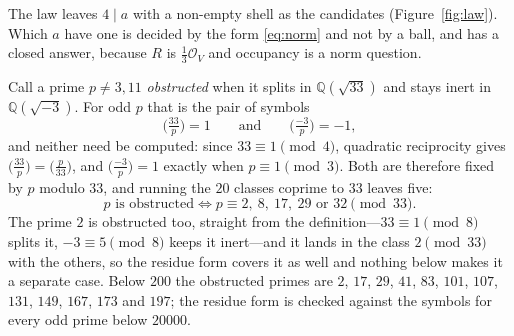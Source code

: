 \documentclass[11pt,reqno]{amsart}
\newcommand{\mc}{$, $}
\newcommand{\mc}{,}
\theoremstyle{plain}
\theoremstyle{definition}
\newcommand{\Q}{\mathbb{Q}}
\newcommand{\Lat}{R}
\newcommand{\Ok}{\mathcal{O}}
\begin{document}
The law leaves $4 \mid a$ with a non-empty shell as the candidates
(Figure~\ref{fig:law}). Which $a$ have
one is decided by the form \eqref{eq:norm} and not by a ball, and has a closed
answer, because $\Lat$ is $\tfrac13\Ok_V$ and occupancy is a norm question.

Call a prime $p \ne 3, 11$ \emph{obstructed} when it splits in $\Q(\sqrt{33})$ and
stays inert in $\Q(\sqrt{-3})$. For odd $p$ that is the pair of symbols
\[
  \Big(\tfrac{33}{p}\Big) = 1
  \qquad\text{and}\qquad
  \Big(\tfrac{-3}{p}\Big) = -1,
\]
and neither need be computed: since $33 \equiv 1 \pmod 4$, quadratic
reciprocity gives $\big(\tfrac{33}{p}\big) = \big(\tfrac{p}{33}\big)$, and
$\big(\tfrac{-3}{p}\big) = 1$ exactly when $p \equiv 1 \pmod 3$. Both are
therefore fixed by $p$ modulo $33$, and running the $20$ classes coprime to $33$
leaves five:
\[
  p \text{ is obstructed}
  \iff
  p \equiv 2,\ 8,\ 17,\ 29 \text{ or } 32 \pmod{33}.
\]
The prime $2$ is obstructed too, straight from the definition---$33 \equiv 1
\pmod 8$ splits it, $-3 \equiv 5 \pmod 8$ keeps it inert---and it lands in the
class $2 \pmod{33}$ with the others, so the residue form covers it as well and
nothing below makes it a separate case. Below $200$ the obstructed primes are
$2\mc 17\mc 29\mc 41\mc 83\mc 101\mc 107\mc 131\mc 149\mc 167\mc 173$ and $197$; the residue form is
checked against the symbols for every odd prime below $20000$.
\end{document}
